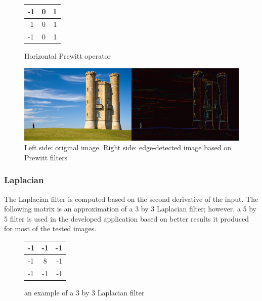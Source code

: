 \documentclass{article}
\begin{document}
\begin{figure}[H]
\begin{center}
 \begin{tabular}{ | l | c | r | }
    \hline
    -1 & 0 & 1 \\ \hline
    -1 & 0 & 1 \\ \hline
    -1 & 0 & 1 \\
    \hline
  \end{tabular}
\end{center}
\caption{Horizontal Prewitt operator\label{pre}}\end{figure}
	\begin{figure} [H]
		\centering
		\includegraphics[scale=0.4]{images/edged}
		\caption{Left side: original image. Right side: edge-detected image based on Prewitt filters \label{edge}}
	\end{figure}

		
		\subsubsection{Laplacian}
			The Laplacian filter is computed based on the second derivative of the input. The following matrix is an approximation of a 3 by 3 Laplacian filter; however, a 5 by 5 filter is used in the developed application based on better results it produced for
most of the tested images.

\begin{figure}[H]
	\begin{center}
  \begin{tabular}{ | l | c | r | }
    \hline
    -1 & -1 & -1 \\ \hline
    -1 & 8 & -1 \\ \hline
    -1 & -1 & -1 \\
    \hline
  \end{tabular}
\end{center}
\caption{an example of a 3 by 3 Laplacian filter}\end{figure}
\end{document}
